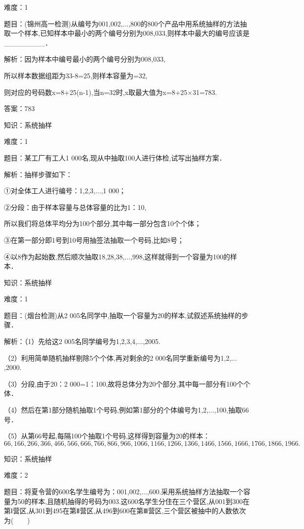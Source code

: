 \documentclass{article} %
\begin{document}
难度：1

题目：(锦州高一检测)从编号为001,002,$\dots$,800的800个产品中用系统抽样的方法抽取一个样本,已知样本中最小的两个编号分别为008,033,则样本中最大的编号应该是\_\_\_\_\_\_\_\_．

解析：因为样本中编号最小的两个编号分别为008,033,

所以样本数据组距为33-8=25,则样本容量为=32,

则对应的号码数x=8+25(n-1),当n=32时,x取最大值为x=8+25$\mathrm{\times}$31=783.

答案：783

知识：系统抽样

难度：1

题目：某工厂有工人1 000名,现从中抽取100人进行体检,试写出抽样方案．

解析：抽样步骤如下：

①对全体工人进行编号：1,2,3,$\dots$,1 000；

②分段：由于样本容量与总体容量的比为1：10,

所以我们将总体平均分为100个部分,其中每一部分包含10个个体；

③在第一部分即1号到10号用抽签法抽取一个号码,比如8号；

④以8作为起始数,然后顺次抽取18,28,38,$\dots$,998,这样就得到一个容量为100的样本．

知识：系统抽样

难度：1

题目：(烟台检测)从2 005名同学中,抽取一个容量为20的样本,试叙述系统抽样的步骤．

解析：（1）先给这2 005名同学编号为1,2,3,4,$\dots$,2005.

（2）利用简单随机抽样剔除5个个体,再对剩余的2 000名同学重新编号为1,2,$\dots$,2000.

（3）分段,由于20：2 000=1：100,故将总体分为20个部分,其中每一部分有100个个体．

（4）然后在第1部分随机抽取1个号码,例如第1部分的个体编号为1,2,$\dots$,100,抽取66号．

（5）从第66号起,每隔100个抽取1个号码,这样得到容量为20的样本：
\[66,166,266,366,466,566,666,766,866,966,1066,1166,1266,1366,1466,1566,1666,1766,1866,1966.\] 


知识：系统抽样

难度：2

题目：将夏令营的600名学生编号为：001,002,$\dots$,600.采用系统抽样方法抽取一个容量为50的样本,且随机抽得的号码为003.这600名学生分住在三个营区,从001到300在第Ⅰ营区,从301到495在第Ⅱ营区,从496到600在第Ⅲ营区,三个营区被抽中的人数依次为(　　)
\end{document}
